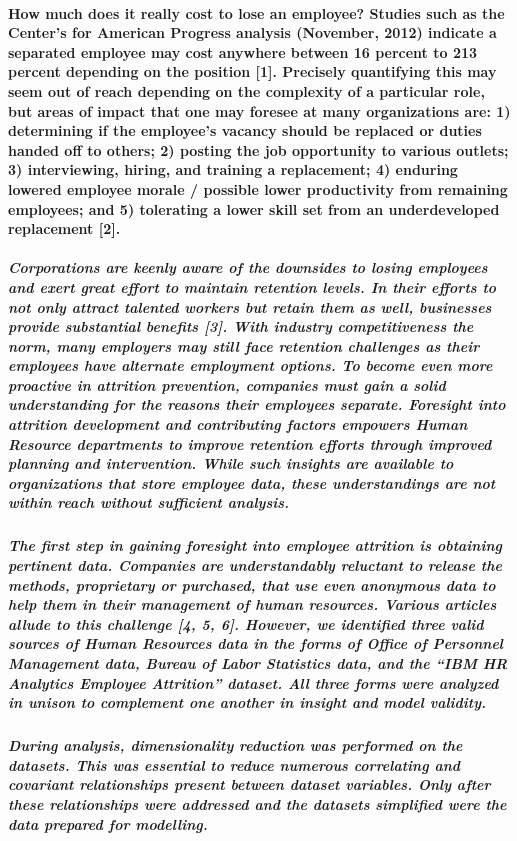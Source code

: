 \documentclass{article}
\begin{document}
\paragraph{How much does it really cost to lose an employee? Studies such as the Center’s for American Progress analysis (November, 2012) indicate a separated employee may cost anywhere between 16 percent to 213 percent depending on the position [1]. Precisely quantifying this may seem out of reach depending on the complexity of a particular role, but areas of impact that one may foresee at many organizations are: 1) determining if the employee’s vacancy should be replaced or duties handed off to others; 2) posting the job opportunity to various outlets; 3) interviewing, hiring, and training a replacement; 4) enduring lowered employee morale / possible lower productivity from remaining employees; and 5) tolerating a lower skill set from an underdeveloped replacement [2].}

\subparagraph{Corporations are keenly aware of the downsides to losing employees and exert great effort to maintain retention levels. In their efforts to not only attract talented workers but retain them as well, businesses provide substantial benefits [3]. With industry competitiveness the norm, many employers may still face retention challenges as their employees have alternate employment options. To become even more proactive in attrition prevention, companies must gain a solid understanding for the reasons their employees separate. Foresight into attrition development and contributing factors empowers Human Resource departments to improve retention efforts through improved planning and intervention. While such insights are available to organizations that store employee data, these understandings are not within reach without sufficient analysis.}

\subparagraph{The first step in gaining foresight into employee attrition is obtaining pertinent data. Companies are understandably reluctant to release the methods, proprietary or purchased, that use even anonymous data to help them in their management of human resources. Various articles allude to this challenge [4, 5, 6]. However, we identified three valid sources of Human Resources data in the forms of Office of Personnel Management data, Bureau of Labor Statistics data, and the “IBM HR Analytics Employee Attrition” dataset. All three forms were analyzed in unison to complement one another in insight and model validity.}

\subparagraph{During analysis, dimensionality reduction was performed on the datasets. This was essential to reduce numerous correlating and covariant relationships present between dataset variables. Only after these relationships were addressed and the datasets simplified were the data prepared for modelling.}
\end{document}
